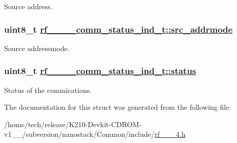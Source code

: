 Source address. \hypertarget{structrf__802__15__4__comm__status__ind__t_1deccf74af49075ccf27788bf7a41084}{
\subsubsection[src\_\-addrmode]{\setlength{\rightskip}{0pt plus 5cm}uint8\_\-t \hyperlink{structrf__802__15__4__comm__status__ind__t_1deccf74af49075ccf27788bf7a41084}{rf\_\_\_\_\-comm\_\-status\_\-ind\_\-t::src\_\-addrmode}}}
\label{structrf__802__15__4__comm__status__ind__t_1deccf74af49075ccf27788bf7a41084}


Source addressmode. \hypertarget{structrf__802__15__4__comm__status__ind__t_674eed88c71b40a8df8b93af54cb8ad0}{
\subsubsection[status]{\setlength{\rightskip}{0pt plus 5cm}uint8\_\-t \hyperlink{structrf__802__15__4__comm__status__ind__t_674eed88c71b40a8df8b93af54cb8ad0}{rf\_\_\_\_\-comm\_\-status\_\-ind\_\-t::status}}}
\label{structrf__802__15__4__comm__status__ind__t_674eed88c71b40a8df8b93af54cb8ad0}


Status of the commications. 

The documentation for this struct was generated from the following file:\begin{CompactItemize}
\item 
/home/tech/release/K210-Devkit-CDROM-v1\_\_/subversion/nanostack/Common/include/\hyperlink{rf__802__15__4_8h}{rf\_\_\_\-4.h}\end{CompactItemize}
